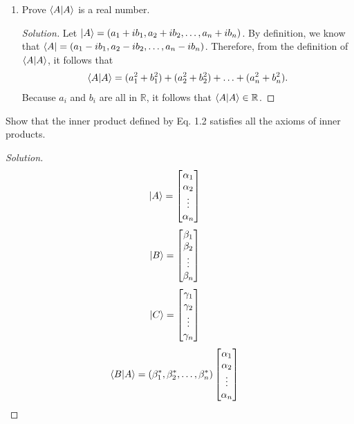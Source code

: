 \documentclass[10pt]{article}
\newenvironment{problem}[2][Problem]{\begin{trivlist}
\item[\hskip \labelsep {\bfseries #1}\hskip \labelsep {\bfseries #2.}]}{\end{trivlist}}
\begin{document}
\begin{problem}{1.1}
\begin{enumerate}
  \item [b)] Prove $\bra{A}\ket{A}$ is a real number.
        \begin{proof}[Solution]
          Let $\ket{A} = (a_1 + i b_1, a_2 + i b_2,\hdots, a_n + i b_n)$. By definition,
          we know that $\bra{A} = (a_1 - i b_1, a_2 - i b_2,\hdots, a_n - i b_n)$.
          Therefore, from the definition of $\bra{A}\ket{A}$, it follows that
          \begin{align*}
            \bra{A}\ket{A} = (a_1^2 + b_1^2) + (a_2^2 + b_2^2) +\hdots + (a_n^2 + b_n^2).
          \end{align*}
          Because $a_i$ and $b_i$ are all in $\mathbb{R}$, it follows that $\bra{A}\ket{A}\in\mathbb{R}$.
        \end{proof}
\end{enumerate}
\end{problem}

\begin{problem}{1.2}
Show that the inner product defined by Eq. 1.2 satisfies all the axioms of inner products.
\end{problem}

\begin{proof}[Solution]

  \begin{align*}
    \ket{A} & = \begin{bmatrix}
      \alpha_{1} \\
      \alpha_{2} \\
      \vdots     \\
      \alpha_{n}
    \end{bmatrix}
  \end{align*}
  \begin{align*}
    \ket{B} & = \begin{bmatrix}
      \beta_{1} \\
      \beta_{2} \\
      \vdots    \\
      \beta_{n}
    \end{bmatrix}
  \end{align*}
  \begin{align*}
    \ket{C} & = \begin{bmatrix}
      \gamma_{1} \\
      \gamma_{2} \\
      \vdots     \\
      \gamma_{n}
    \end{bmatrix}
  \end{align*}
  \begin{align*}
    \bra{B}\ket{A} & = (\beta_1^*, \beta_2^*, \hdots, \beta_n^*)\begin{bmatrix}
      \alpha_{1} \\
      \alpha_{2} \\
      \vdots     \\
      \alpha_{n}
    \end{bmatrix}
  \end{align*}
\end{proof}
\end{document}
